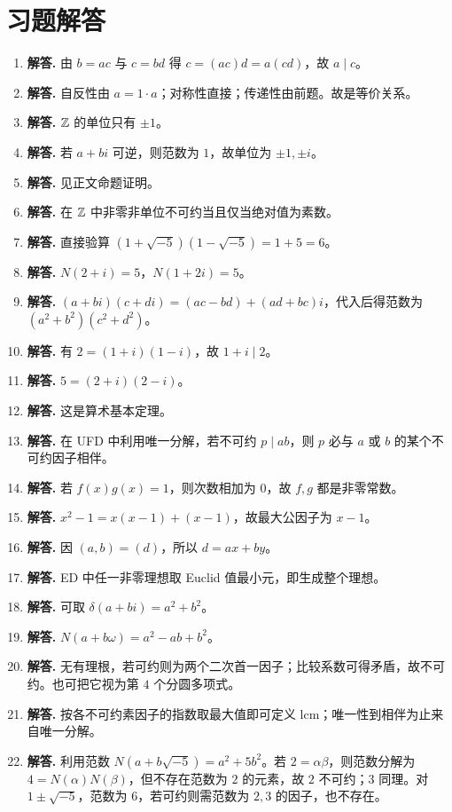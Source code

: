 \section*{习题解答}
\begin{enumerate}[label=\textbf{\arabic*.}, leftmargin=*, itemsep=1em]
\item \textbf{解答.} 由 $b=ac$ 与 $c=bd$ 得 $c=(ac)d=a(cd)$，故 $a\mid c$。
\item \textbf{解答.} 自反性由 $a=1\cdot a$；对称性直接；传递性由前题。故是等价关系。
\item \textbf{解答.} $\mathbb{Z}$ 的单位只有 $\pm1$。
\item \textbf{解答.} 若 $a+bi$ 可逆，则范数为 $1$，故单位为 $\pm1,\pm i$。
\item \textbf{解答.} 见正文命题证明。
\item \textbf{解答.} 在 $\mathbb{Z}$ 中非零非单位不可约当且仅当绝对值为素数。
\item \textbf{解答.} 直接验算 $(1+\sqrt{-5})(1-\sqrt{-5})=1+5=6$。
\item \textbf{解答.} $N(2+i)=5$，$N(1+2i)=5$。
\item \textbf{解答.} $(a+bi)(c+di)=(ac-bd)+(ad+bc)i$，代入后得范数为 $(a^2+b^2)(c^2+d^2)$。
\item \textbf{解答.} 有 $2=(1+i)(1-i)$，故 $1+i\mid2$。
\item \textbf{解答.} $5=(2+i)(2-i)$。
\item \textbf{解答.} 这是算术基本定理。
\item \textbf{解答.} 在 UFD 中利用唯一分解，若不可约 $p\mid ab$，则 $p$ 必与 $a$ 或 $b$ 的某个不可约因子相伴。
\item \textbf{解答.} 若 $f(x)g(x)=1$，则次数相加为 $0$，故 $f,g$ 都是非零常数。
\item \textbf{解答.} $x^2-1=x(x-1)+(x-1)$，故最大公因子为 $x-1$。
\item \textbf{解答.} 因 $(a,b)=(d)$，所以 $d=ax+by$。
\item \textbf{解答.} ED 中任一非零理想取 Euclid 值最小元，即生成整个理想。
\item \textbf{解答.} 可取 $\delta(a+bi)=a^2+b^2$。
\item \textbf{解答.} $N(a+b\omega)=a^2-ab+b^2$。
\item \textbf{解答.} 无有理根，若可约则为两个二次首一因子；比较系数可得矛盾，故不可约。也可把它视为第 $4$ 个分圆多项式。
\item \textbf{解答.} 按各不可约素因子的指数取最大值即可定义 lcm；唯一性到相伴为止来自唯一分解。
\item \textbf{解答.} 利用范数 $N(a+b\sqrt{-5})=a^2+5b^2$。若 $2=\alpha\beta$，则范数分解为 $4=N(\alpha)N(\beta)$，但不存在范数为 $2$ 的元素，故 $2$ 不可约；$3$ 同理。对 $1\pm\sqrt{-5}$，范数为 $6$，若可约则需范数为 $2,3$ 的因子，也不存在。

\end{enumerate}
